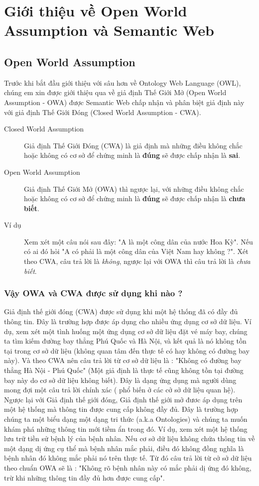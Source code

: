 \chapter{Giới thiệu về Open World Assumption và Semantic Web}
\section{Open World Assumption}
Trước khi bắt đầu giới thiệu với sâu hơn về Ontology Web Language (OWL), chúng em xin được giới thiệu qua về giả định Thế Giới Mở (Open World Assumption - OWA)\cite{OWA_0} được Semantic Web chấp nhận và phân biệt giả định này với giả định Thế Giới Đóng (Closed World Assumption - CWA).
\begin{description}
\item[Closed World Assumption] 
Giả định Thế Giới Đóng (CWA) là giả định mà những điều không chắc hoặc không có cơ sở để chứng minh là \textbf{đúng} sẽ được chấp nhận là \textbf{sai}.
\item[Open World Assumption]
Giả định Thế Giới Mở (OWA) thì ngược lại, với những điều không chắc hoặc không có cơ sở để chứng minh là \textbf{đúng} sẽ được chấp nhận là \textbf{chưa biết}. 
\item[Ví dụ]
Xem xét một câu nói sau đây: "A là một công dân của nước Hoa Kỳ". Nếu có ai đó hỏi "A có phải là một công dân của Việt Nam hay không ?". Xét theo CWA, câu trả lời là \textit{không}, ngược lại với OWA thì câu trả lời là \textit{chưa biết}. 
\end{description}
\subsection{Vậy OWA và CWA được sử dụng khi nào ?}
Giả định thế giới đóng (CWA) được sử dụng khi một hệ thống đã có đầy đủ thông tin. Đây là trường hợp được áp dụng cho nhiều ứng dụng cơ sở dữ liệu. Ví dụ, xem xét một tình huống một ứng dụng cơ sở dữ liệu đặt vé máy bay, chúng ta tìm kiếm đường bay thẳng Phú Quốc và Hà Nội, và kết quả là nó không tồn tại trong cơ sở dữ liệu (không quan tâm đến thực tế có hay không có đường bay này). Và theo CWA nên câu trả lời từ cơ sở dữ liệu là : "Không có đường bay thẳng Hà Nội - Phú Quốc" (Một giả định là thực tế cũng không tồn tại đường bay này do cơ sở dữ liệu không biết). Đây là dạng ứng dụng mà người dùng mong đợi một câu trả lời chính xác ( phổ biến ở các cở sở dữ liệu quan hệ).
\\Ngược lại với Giả định thế giới đóng, Giả định thế giới mở đươc áp dụng trên một hệ thống mà thông tin được cung cấp không đầy đủ. Đây là trường hợp chúng ta một biểu dạng một dạng tri thức (a.k.a Ontologies) và chúng ta muốn khám phá những thông tin mới tiềm ẩn trong đó. Ví dụ, xem xét một hệ thống lưu trữ tiền sử bệnh lý của bệnh nhân. Nếu cơ sở dữ liệu không chứa thông tin về một dạng dị ứng cụ thể mà bệnh nhân mắc phải, điều đó không đồng nghĩa là bệnh nhân đó không mắc phải nó trên thực tế. Từ đó câu trả lời từ cở sở dữ liệu theo chuẩn OWA sẽ là : "Không rõ bệnh nhân này có mắc phải dị ứng đó không, trừ khi những thông tin đầy đủ hơn được cung cấp".

